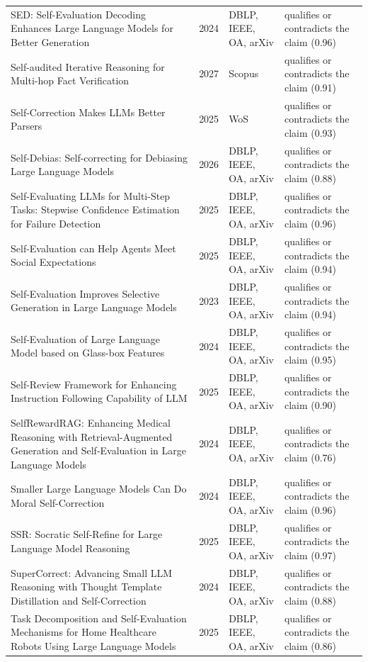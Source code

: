 \begin{longtable}{@{}%
  >{\raggedright\arraybackslash}p{}c%
  >{\raggedright\arraybackslash}p{}%
  >{\raggedright\arraybackslash}p{}@{}}
SED: Self-Evaluation Decoding Enhances Large Language Models for Better Generation & 2024 & DBLP, IEEE, OA, arXiv & qualifies or contradicts the claim (0.96) \\
Self-audited Iterative Reasoning for Multi-hop Fact Verification & 2027 & Scopus & qualifies or contradicts the claim (0.91) \\
Self-Correction Makes LLMs Better Parsers & 2025 & WoS & qualifies or contradicts the claim (0.93) \\
Self-Debias: Self-correcting for Debiasing Large Language Models & 2026 & DBLP, IEEE, OA, arXiv & qualifies or contradicts the claim (0.88) \\
Self-Evaluating LLMs for Multi-Step Tasks: Stepwise Confidence Estimation for Failure Detection & 2025 & DBLP, IEEE, OA, arXiv & qualifies or contradicts the claim (0.96) \\
Self-Evaluation can Help Agents Meet Social Expectations & 2025 & DBLP, IEEE, OA, arXiv & qualifies or contradicts the claim (0.94) \\
Self-Evaluation Improves Selective Generation in Large Language Models & 2023 & DBLP, IEEE, OA, arXiv & qualifies or contradicts the claim (0.94) \\
Self-Evaluation of Large Language Model based on Glass-box Features & 2024 & DBLP, IEEE, OA, arXiv & qualifies or contradicts the claim (0.95) \\
Self-Review Framework for Enhancing Instruction Following Capability of LLM & 2025 & DBLP, IEEE, OA, arXiv & qualifies or contradicts the claim (0.90) \\
SelfRewardRAG: Enhancing Medical Reasoning with Retrieval-Augmented Generation and Self-Evaluation in Large Language Models & 2024 & DBLP, IEEE, OA, arXiv & qualifies or contradicts the claim (0.76) \\
Smaller Large Language Models Can Do Moral Self-Correction & 2024 & DBLP, IEEE, OA, arXiv & qualifies or contradicts the claim (0.96) \\
SSR: Socratic Self-Refine for Large Language Model Reasoning & 2025 & DBLP, IEEE, OA, arXiv & qualifies or contradicts the claim (0.97) \\
SuperCorrect: Advancing Small LLM Reasoning with Thought Template Distillation and Self-Correction & 2024 & DBLP, IEEE, OA, arXiv & qualifies or contradicts the claim (0.88) \\
Task Decomposition and Self-Evaluation Mechanisms for Home Healthcare Robots Using Large Language Models & 2025 & DBLP, IEEE, OA, arXiv & qualifies or contradicts the claim (0.86) \\

\end{longtable}
